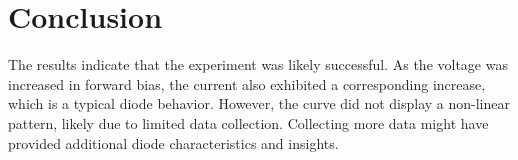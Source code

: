 \section{Conclusion}

The results indicate that the experiment was likely successful. As the voltage was increased in forward bias, the current also exhibited a corresponding increase, which is a typical diode behavior. However, the curve did not display a non-linear pattern, likely due to limited data collection. Collecting more data might have provided additional diode characteristics and insights.

